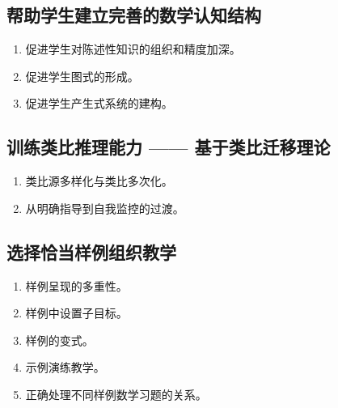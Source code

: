 \begin{multicols}{2}
\subsection{帮助学生建立完善的数学认知结构}
\begin{enumerate}
    \item 促进学生对陈述性知识的组织和精度加深。
    \item 促进学生图式的形成。
    \item 促进学生产生式系统的建构。
\end{enumerate}


\subsection{训练类比推理能力 —— 基于类比迁移理论}
\begin{enumerate}
    \item 类比源多样化与类比多次化。
    \item 从明确指导到自我监控的过渡。
\end{enumerate}

\columnbreak

\subsection{选择恰当样例组织教学}
\begin{enumerate}
    \item 样例呈现的多重性。
    \item 样例中设置子目标。
    \item 样例的变式。
    \item 示例演练教学。
    \item 正确处理不同样例数学习题的关系。
\end{enumerate}
\end{multicols}